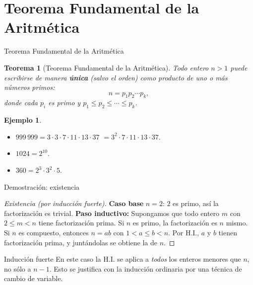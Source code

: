 \documentclass[10pt,aspectratio=169]{beamer}
\theoremstyle{definition}
\newtheorem{ejemplo}{Ejemplo}
\theoremstyle{plain}
\newtheorem{teorema}{Teorema}
\theoremstyle{remark}
\begin{document}
\section{Teorema Fundamental de la Aritmética}
\begin{frame}{Teorema Fundamental de la Aritmética}
  \begin{teorema}[Teorema Fundamental de la Aritmética]
    Todo entero $n>1$ puede escribirse de manera \textbf{única} (salvo el
    orden) como producto de uno o más números primos:
    \[
      n = p_1 p_2 \cdots p_k,
    \]
    donde cada $p_i$ es primo y $p_1\le p_2\le \cdots\le p_k$.
  \end{teorema}
  \begin{ejemplo}
    \begin{itemize}
      \item $999\,999 = 3\cdot 3\cdot 7\cdot 11\cdot 13\cdot 37$
            $= 3^2\cdot 7\cdot 11\cdot 13\cdot 37$.
      \item $1024 = 2^{10}$.
      \item $360 = 2^3\cdot 3^2\cdot 5$.
    \end{itemize}
  \end{ejemplo}
\end{frame}

\begin{frame}{Demostración: existencia}
  \begin{proof}[Existencia (por inducción fuerte)]
    \textbf{Caso base} $n=2$: $2$ es primo, así la factorización es
    trivial. \checkmark
    \vspace{0.3em}
    \textbf{Paso inductivo:} Supongamos que todo entero $m$ con
    $2\le m<n$ tiene factorización prima. Si $n$ es primo, la
    factorización es $n$ mismo. Si $n$ es compuesto, entonces
    $n=ab$ con $1<a\le b<n$. Por H.I., $a$ y $b$ tienen factorización
    prima, y juntándolas se obtiene la de $n$.
  \end{proof}
  \begin{alertblock}{Inducción fuerte}
    En este caso la H.I. se aplica a \emph{todos} los enteros menores
    que $n$, no sólo a $n-1$. Esto se justifica con la inducción
    ordinaria por una técnica de cambio de variable.
  \end{alertblock}
\end{frame}
\end{document}

